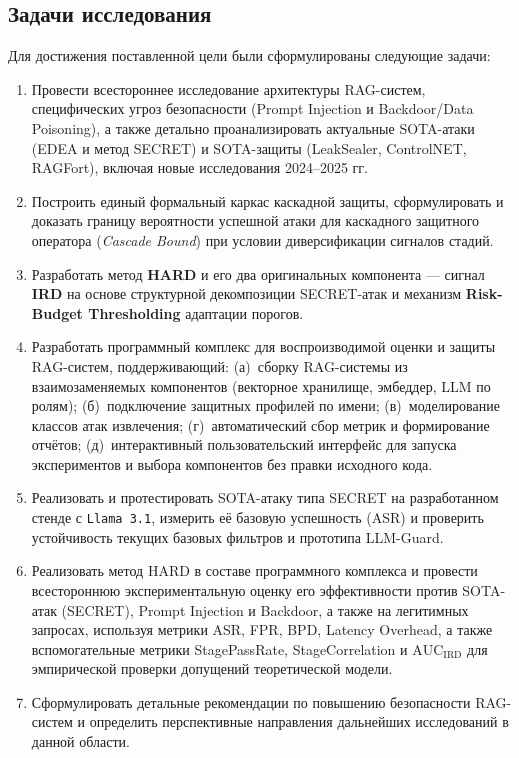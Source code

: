 \documentclass[12pt, a4paper]{article}
\theoremstyle{definition}
\theoremstyle{remark}
\begin{document}
\subsection{Задачи исследования}
\label{sec:research_objectives}

Для достижения поставленной цели были сформулированы следующие задачи:
\begin{enumerate}[label=\arabic*.]
    \item Провести всестороннее исследование архитектуры RAG-систем, специфических угроз безопасности (Prompt Injection и Backdoor/Data Poisoning), а также детально проанализировать актуальные SOTA-атаки (EDEA и метод SECRET) и SOTA-защиты (LeakSealer, ControlNET, RAGFort), включая новые исследования 2024--2025 гг.
    \item Построить единый формальный каркас каскадной защиты, сформулировать и доказать границу вероятности успешной атаки для каскадного защитного оператора (\textit{Cascade Bound}) при условии диверсификации сигналов стадий.
    \item Разработать метод \textbf{HARD} и его два оригинальных компонента --- сигнал \textbf{IRD} на основе структурной декомпозиции SECRET-атак и механизм \textbf{Risk-Budget Thresholding} адаптации порогов.
    \item Разработать программный комплекс для воспроизводимой оценки и защиты RAG-систем, поддерживающий: (а)~сборку RAG-системы из взаимозаменяемых компонентов (векторное хранилище, эмбеддер, LLM по ролям); (б)~подключение защитных профилей по имени; (в)~моделирование классов атак извлечения; (г)~автоматический сбор метрик и формирование отчётов; (д)~интерактивный пользовательский интерфейс для запуска экспериментов и выбора компонентов без правки исходного кода.
    \item Реализовать и протестировать SOTA-атаку типа SECRET на разработанном стенде с \texttt{Llama~3.1}, измерить её базовую успешность (ASR) и проверить устойчивость текущих базовых фильтров и прототипа LLM-Guard.
    \item Реализовать метод HARD в составе программного комплекса и провести всестороннюю экспериментальную оценку его эффективности против SOTA-атак (SECRET), Prompt Injection и Backdoor, а также на легитимных запросах, используя метрики ASR, FPR, BPD, Latency Overhead, а также вспомогательные метрики StagePassRate, StageCorrelation и $\mathrm{AUC}_{\text{IRD}}$ для эмпирической проверки допущений теоретической модели.
    \item Сформулировать детальные рекомендации по повышению безопасности RAG-систем и определить перспективные направления дальнейших исследований в данной области.
\end{enumerate}
\end{document}
